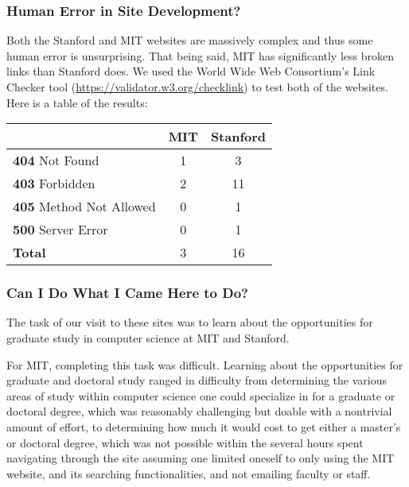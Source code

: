 \subsubsection*{Human Error in Site Development?}

Both the Stanford and MIT websites are massively complex and thus some human error is unsurprising.
That being said, MIT has significantly less broken links than Stanford does. We used the
World Wide Web Consortium's Link Checker tool (\url{https://validator.w3.org/checklink})
to test both of the websites. Here is a table of the results:

\begin{center}
\begin{tabular}{|l|c|c|}
\hline
                                & \textbf{MIT} & \textbf{Stanford} \\ \hline
\textbf{404} Not Found          & 1            & 3                 \\ \hline
\textbf{403} Forbidden          & 2            & 11                \\ \hline
\textbf{405} Method Not Allowed & 0            & 1                 \\ \hline
\textbf{500} Server Error       & 0            & 1                 \\ \hline \hline
\textbf{Total}                  & 3            & 16                \\ \hline
\end{tabular}
\end{center}

\subsubsection*{Can I Do What I Came Here to Do?}

The task of our visit to these sites was to learn about the opportunities for
graduate study in computer science at MIT and Stanford.

For MIT, completing this task was difficult. Learning about the opportunities for
graduate and doctoral study ranged in difficulty from determining the various areas
of study within computer science one could specialize in for a graduate or doctoral
degree, which was reasonably challenging but doable with a nontrivial amount of effort,
to determining how much it would cost to get either a master's or doctoral degree,
which was not possible within the several hours spent navigating through the site
assuming one limited oneself to only using the MIT website, and its searching
functionalities, and not emailing faculty or staff.

